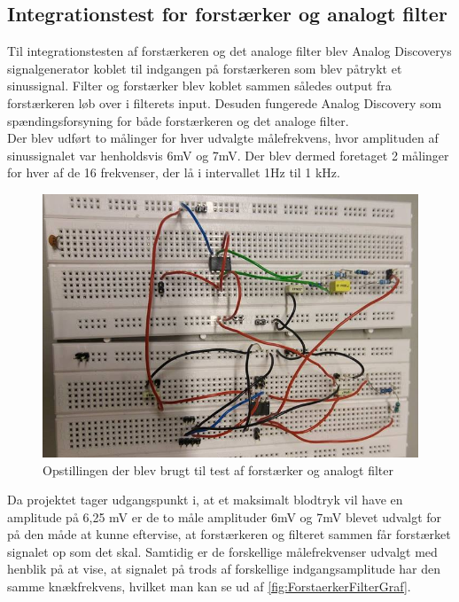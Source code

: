 \subsection{Integrationstest for forstærker og analogt filter}
Til integrationstesten af forstærkeren og det analoge filter blev Analog Discoverys signalgenerator koblet til indgangen på forstærkeren som blev påtrykt et sinussignal. Filter og forstærker blev koblet sammen således output fra forstærkeren løb over i filterets input. Desuden fungerede Analog Discovery som spændingsforsyning for både forstærkeren og det analoge filter.\\
Der blev udført to målinger for hver udvalgte målefrekvens, hvor amplituden af sinussignalet var henholdsvis 6mV og 7mV. Der blev dermed foretaget 2 målinger for hver af de 16 frekvenser, der lå i intervallet 1Hz til 1 kHz. 

\begin{figure}[H]
	\centering
	\includegraphics[width=1\textwidth]{Figurer/Hardware/samletopstilling}
	\caption{Opstillingen der blev brugt til test af forstærker og analogt filter}
	\label{fig:ForstaerkerFilterOpstiling}
\end{figure}

Da projektet tager udgangspunkt i, at et maksimalt blodtryk vil have en amplitude på 6,25 mV er de to måle amplituder 6mV og 7mV blevet udvalgt for på den måde at kunne eftervise, at forstærkeren og filteret sammen får forstærket signalet op som det skal. Samtidig er de forskellige målefrekvenser udvalgt med henblik på at vise, at signalet på trods af forskellige indgangsamplitude har den samme knækfrekvens, hvilket man kan se ud af \ref{fig:ForstaerkerFilterGraf}.

